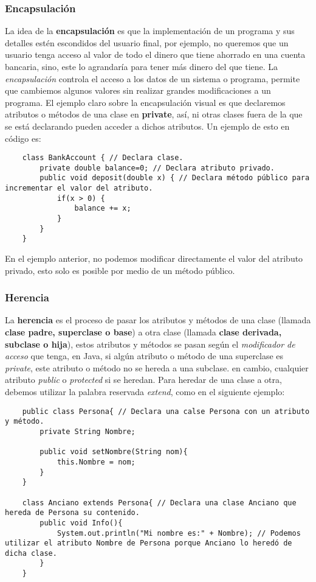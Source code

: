 \subsubsection{Encapsulación}

La idea de la \textbf{encapsulación} es que la implementación de un programa y sus detalles estén escondidos del usuario final, por ejemplo, no queremos que un usuario tenga acceso al valor de todo el dinero que tiene ahorrado en una cuenta bancaria, sino, este lo agrandaría para tener más dinero del que tiene. La \textit{encapsulación} controla el acceso a los datos de un sistema o programa, permite que cambiemos algunos valores sin realizar grandes modificaciones a un programa. El ejemplo claro sobre la encapsulación visual es que declaremos atributos o métodos de una clase en \textbf{private}, así, ni otras clases fuera de la que se está declarando pueden acceder a dichos atributos. Un ejemplo de esto en código es:
\begin{lstlisting}
    class BankAccount { // Declara clase.
        private double balance=0; // Declara atributo privado.
        public void deposit(double x) { // Declara método público para incrementar el valor del atributo.
            if(x > 0) {
                balance += x;
            }
        }
    }
\end{lstlisting}

En el ejemplo anterior, no podemos modificar directamente el valor del atributo privado, esto solo es posible por medio de un método público.


\subsubsection{Herencia}

La \textbf{herencia} es el proceso de pasar los atributos y métodos de una clase (llamada \textbf{clase padre, superclase o base}) a otra clase (llamada \textbf{clase derivada, subclase o hija}), estos atributos y métodos se pasan según el \textit{modificador de acceso} que tenga, en Java, si algún atributo o método de una superclase es \textit{private}, este atributo o método no se hereda a una subclase. en cambio, cualquier atributo \textit{public} o \textit{protected} si se heredan. Para heredar de una clase a otra, debemos utilizar la palabra reservada \textit{extend}, como en el siguiente ejemplo:
\begin{lstlisting}
    public class Persona{ // Declara una calse Persona con un atributo y método.
        private String Nombre;
        
        public void setNombre(String nom){
            this.Nombre = nom;
        }
    }
    
    class Anciano extends Persona{ // Declara una clase Anciano que hereda de Persona su contenido.
        public void Info(){
            System.out.println("Mi nombre es:" + Nombre); // Podemos utilizar el atributo Nombre de Persona porque Anciano lo heredó de dicha clase.
        }
    }
\end{lstlisting}

